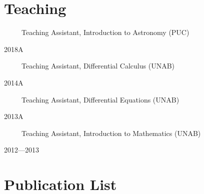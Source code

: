 \documentclass[12pt, a4paper]{article} %
\begin{document}
\section*{Teaching}

\begin{flushleft}%
  \setlength{\leftskip}{0.2cm}%
\end{flushleft}
\begin{minipage}[t]{0.6\textwidth}
\ \ \ \ \ Teaching Assistant, Introduction to Astronomy (PUC)
\end{minipage}
\begin{minipage}[t]{0.4\textwidth}
\hfill 2018A
\end{minipage}
\begin{minipage}[t]{0.7\textwidth}
\ \ \ \ \ Teaching Assistant, Differential Calculus (UNAB)
\end{minipage}
\begin{minipage}[t]{0.3\textwidth}
\hfill 2014A
\end{minipage}
\begin{minipage}[t]{0.7\textwidth}
\ \ \ \ \ Teaching Assistant, Differential Equations (UNAB)
\end{minipage}
\begin{minipage}[t]{0.3\textwidth}
\hfill 2013A
\end{minipage}
\begin{minipage}[t]{0.7\textwidth}
\ \ \ \ \ Teaching Assistant, Introduction to Mathematics (UNAB)
\end{minipage}
\begin{minipage}[t]{0.3\textwidth}
\hfill 2012---2013
\end{minipage}




\section*{Publication List}
\end{document}
